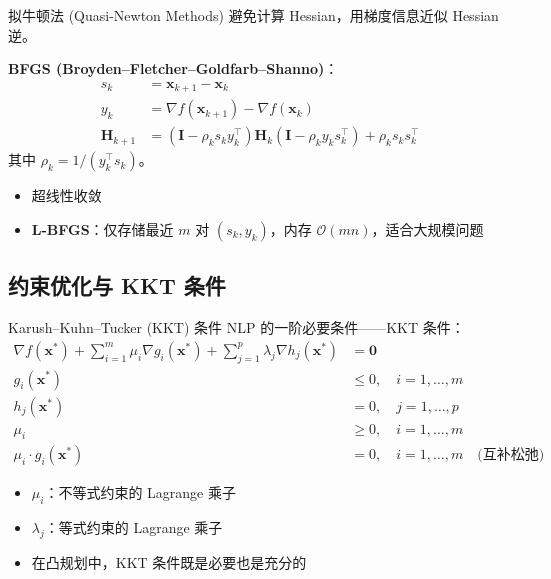 \documentclass[11pt, aspectratio=169, svgnames, table, fontset=fandol]{ctexbeamer}
\begin{document}
\begin{frame}{拟牛顿法 (Quasi-Newton Methods)}
  避免计算 Hessian，用梯度信息近似 Hessian 逆。

  \vspace{6pt}
  \textbf{BFGS (Broyden–Fletcher–Goldfarb–Shanno)}：
  \begin{align*}
    s_k &= \bm{x}_{k+1} - \bm{x}_k \\
    y_k &= \nabla f(\bm{x}_{k+1}) - \nabla f(\bm{x}_k) \\
    \bm{H}_{k+1} &= \left(\bm{I} - \rho_k s_k y_k^\top\right) \bm{H}_k \left(\bm{I} - \rho_k y_k s_k^\top\right) + \rho_k s_k s_k^\top
  \end{align*}
  其中 $\rho_k = 1 / (y_k^\top s_k)$。

  \begin{itemize}
    \item 超线性收敛
    \item \textbf{L-BFGS}：仅存储最近 $m$ 对 $(s_k, y_k)$，内存 $\mathcal{O}(mn)$，适合大规模问题
  \end{itemize}
\end{frame}

\subsection{约束优化与 KKT 条件}

\begin{frame}{Karush–Kuhn–Tucker (KKT) 条件}
  NLP 的一阶必要条件——KKT 条件：
  \begin{align*}
    \nabla f(\bm{x}^*) + \sum_{i=1}^m \mu_i \nabla g_i(\bm{x}^*) + \sum_{j=1}^p \lambda_j \nabla h_j(\bm{x}^*) &= \bm{0} \\
    g_i(\bm{x}^*) &\leq 0,\quad i=1,\dots,m \\
    h_j(\bm{x}^*) &= 0,\quad j=1,\dots,p \\
    \mu_i &\geq 0,\quad i=1,\dots,m \\
    \mu_i \cdot g_i(\bm{x}^*) &= 0,\quad i=1,\dots,m \quad \text{(互补松弛)}
  \end{align*}

  \begin{itemize}
    \item $\mu_i$：不等式约束的 Lagrange 乘子
    \item $\lambda_j$：等式约束的 Lagrange 乘子
    \item 在凸规划中，KKT 条件既是必要也是充分的
  \end{itemize}
\end{frame}
\end{document}
